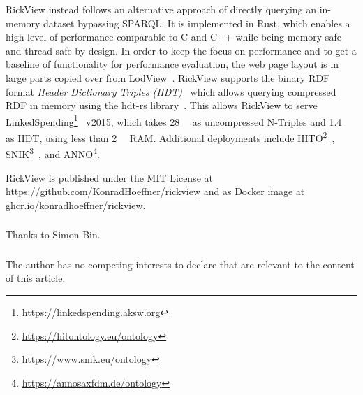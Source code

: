 \documentclass[runningheads]{llncs}
\newcommand\citep[1]{\cite{#1}}
\begin{document}
RickView instead follows an alternative approach of directly querying an in-memory dataset bypassing SPARQL.
It is implemented in Rust, which enables a high level of performance comparable to C and C++ while being memory-safe and thread-safe by design.
In order to keep the focus on performance and to get a baseline of functionality for performance evaluation, the web page layout is in large parts copied
over from LodView~\citep{lodview,adaptinglodview}.
%
RickView supports the binary RDF format \emph{Header Dictionary Triples (HDT)}~\citep{hdt2012} which allows querying compressed RDF in memory using the hdt-rs library~\citep{hdtrs}.
This allows RickView to serve LinkedSpending\footnote{\url{https://linkedspending.aksw.org}}~\citep{linkedspending} v2015, which takes \SI{28}{\giga\byte} as uncompressed N-Triples and \SI{1.4}{\giga\byte} as HDT, using less than \SI{2}{\giga\byte} RAM.
%
Additional deployments include HITO\footnote{\url{https://hitontology.eu/ontology}}~\citep{hito}, SNIK\footnote{\url{https://www.snik.eu/ontology}}~\citep{snik},
 and ANNO\footnote{\url{https://annosaxfdm.de/ontology}}.

RickView is published under the MIT License at \url{https://github.com/KonradHoeffner/rickview} and as Docker image at \url{ghcr.io/konradhoeffner/rickview}.

\begin{credits}
\subsubsection{\ackname}
Thanks to Simon Bin.

\subsubsection{\discintname}
The author has no competing interests to declare that are relevant to the content of this article.
\end{credits}
%


\end{document}
